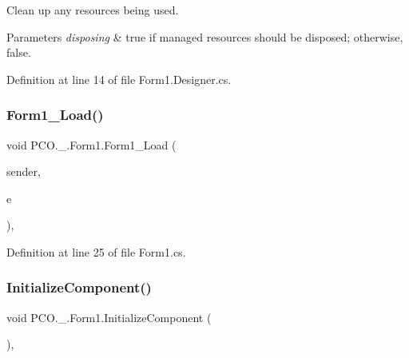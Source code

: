 Clean up any resources being used. 


\begin{DoxyParams}{Parameters}
{\em disposing} & true if managed resources should be disposed; otherwise, false.\\
\hline
\end{DoxyParams}


Definition at line 14 of file Form1.\+Designer.\+cs.

\mbox{\label{classPCO_1_1__0_1_1Form1_ad0b73303308d064881f00e8b0f6db48c}} 
\subsubsection{\texorpdfstring{Form1\+\_\+\+Load()}{Form1\_Load()}}
{\footnotesize\ttfamily void P\+C\+O.\+\_.\+Form1.\+Form1\+\_\+\+Load (\begin{DoxyParamCaption}\item[{object}]{sender,  }\item[{Event\+Args}]{e }\end{DoxyParamCaption})\hspace{0.3cm}{\ttfamily [inline]}, {\ttfamily [private]}}



Definition at line 25 of file Form1.\+cs.

\mbox{\label{classPCO_1_1__0_1_1Form1_a27fd22008e6d99921f9e193bd4d05c14}} 
\subsubsection{\texorpdfstring{Initialize\+Component()}{InitializeComponent()}}
{\footnotesize\ttfamily void P\+C\+O.\+\_.\+Form1.\+Initialize\+Component (\begin{DoxyParamCaption}{ }\end{DoxyParamCaption})\hspace{0.3cm}{\ttfamily [inline]}, {\ttfamily [private]}}



